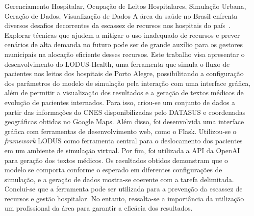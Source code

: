 \documentclass[portuguese,oneside]{pucrs-ppgcc}
\begin{document}
\begin{resumo}{Gerenciamento Hospitalar, Ocupação de Leitos Hospitalares, Simulação Urbana, Geração de Dados, Visualização de Dados}
A área da saúde no Brasil enfrenta diversos desafios decorrentes da escassez de recursos nos hospitais do país~\cite{ORCAMENTOSAUDEBR}. Explorar técnicas que ajudem a mitigar o uso inadequado de recursos e prever cenários de alta demanda no futuro pode ser de grande auxílio para os gestores municipais na alocação eficiente desses recursos.
Este trabalho visa apresentar o desenvolvimento do LODUS-Health, uma ferramenta que simula o fluxo de pacientes nos leitos dos hospitais de Porto Alegre, possibilitando a configuração dos parâmetros do modelo de simulação pela interação com uma interface gráfica, além de permitir a visualização dos resultados e a geração de textos médicos de evolução de pacientes internados.
Para isso, criou-se um conjunto de dados a partir das informações do CNES disponibilizadas pelo DATASUS e coordenadas geográficas obtidas no Google Maps. Além disso, foi desenvolvida uma interface gráfica com ferramentas de desenvolvimento web, como o Flask. Utilizou-se o \textit{framework} LODUS como ferramenta central para o deslocamento dos pacientes em um ambiente de simulação virtual. Por fim, foi utilizada a API da OpenAI para geração dos textos médicos.
Os resultados obtidos demonstram que o modelo se comporta conforme o esperado em diferentes configurações de simulação, e a geração de dados mostra-se coerente com a tarefa delimitada.
Conclui-se que a ferramenta pode ser utilizada para a prevenção da escassez de recursos e gestão hospitalar. No entanto, ressalta-se a importância da utilização um profissional da área para garantir a eficácia dos resultados.
\end{resumo}
\end{document}

